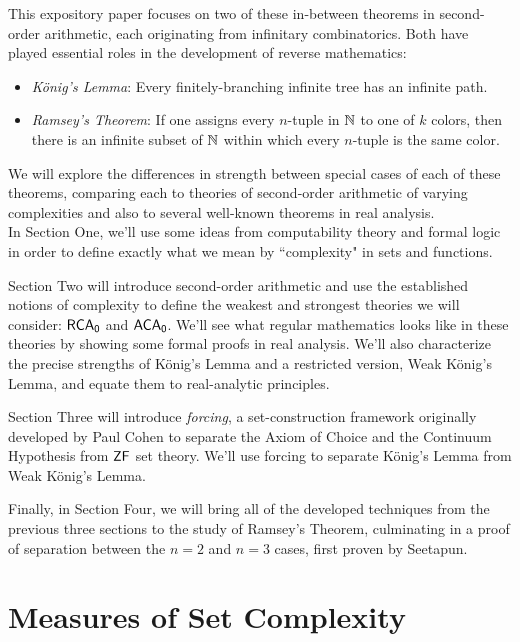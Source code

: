\documentclass{amsart}
\begin{document}
{		This expository paper focuses on two of these in-between theorems in second-order arithmetic, each originating from infinitary combinatorics. Both have played essential roles in the development of reverse mathematics:
		\begin{itemize}
			\item \textit{K\"onig's Lemma}: Every finitely-branching infinite tree has an infinite path.
			\item \textit{Ramsey's Theorem}: If one assigns every $n$-tuple in $\mathbb{N}$ to one of $k$ colors, then there is an infinite subset of $\mathbb{N}$ within which every $n$-tuple is the same color.
		\end{itemize}
		We will explore the differences in strength between special cases of each of these theorems, comparing each to theories of second-order arithmetic of varying complexities and also to several well-known theorems in real analysis.\\ 
		
		In Section One, we'll use some ideas from computability theory and formal logic in order to define exactly what we mean by ``complexity" in sets and functions. 
		
		Section Two will introduce second-order arithmetic and use the established notions of complexity to define the weakest and strongest theories we will consider: $\operatorname{\sf{RCA_0}}$ and $\operatorname{\sf{ACA_0}}$. We'll see what regular mathematics looks like in these theories by showing some formal proofs in real analysis. We'll also characterize the precise strengths of K\"onig's Lemma and a restricted version, Weak K\"onig's Lemma, and equate them to real-analytic principles.
		
		Section Three will introduce \textit{forcing}, a set-construction framework originally developed by Paul Cohen to separate the Axiom of Choice and the Continuum Hypothesis from $\sf{ZF}$ set theory. We'll use forcing to separate K\"onig's Lemma from Weak K\"onig's Lemma.
		
		Finally, in Section Four, we will bring all of the developed techniques from the previous three sections to the study of Ramsey's Theorem, culminating in a proof of separation between the $n=2$ and $n=3$ cases, first proven by Seetapun. 
		
	}
	
	\newpage
	
	\section{Measures of Set Complexity}
	
\end{document}
